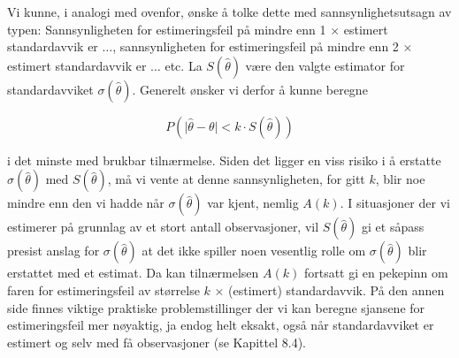 \noindent Vi kunne, i analogi med ovenfor, ønske å tolke dette
med sannsynlighets\-utsagn av typen: Sannsynligheten for
estimeringsfeil på mindre enn 1 $\times$ estimert standardavvik er
$\ldots$, sannsynligheten for estimeringsfeil på mindre enn 2 $\times$
estimert standardavvik er $\ldots$ etc.
La $S( \hat{\theta} )$ være den valgte estimator
for standardavviket $\sigma ( \hat{\theta} )$. Generelt ønsker vi derfor 
å kunne beregne

\[ P(\mid \hat{\theta} - \theta \mid < k \cdot S(\hat{\theta})) \]

\noindent i det minste med brukbar tilnærmelse. Siden det ligger en viss
risiko i å erstatte $\sigma (\hat{\theta})$ med $S(\hat{\theta})$, må
vi vente at denne sannsynligheten, for gitt $k$, blir noe mindre enn den
vi hadde når $\sigma (\hat{\theta})$ var kjent, nemlig $A(k)$. I
situa\-sjoner der vi estimerer på grunnlag av et stort antall
observasjoner, vil $S(\hat{\theta})$ gi et såpass presist anslag for
$\sigma (\hat{\theta})$ at det ikke spiller noen vesentlig rolle om
$\sigma (\hat{\theta})$ blir erstattet med et estimat. Da kan
tilnærmelsen $A(k)$ fortsatt gi en pekepinn om faren for
estimeringsfeil av størrelse $k$ $\times$ (estimert) standardavvik. På
den annen side finnes viktige praktiske problemstillinger der vi
kan beregne sjansene for estimeringsfeil mer nøyaktig, ja endog
helt eksakt, også når standardavviket er estimert og selv med få
observasjoner (se Kapittel 8.4).\\

